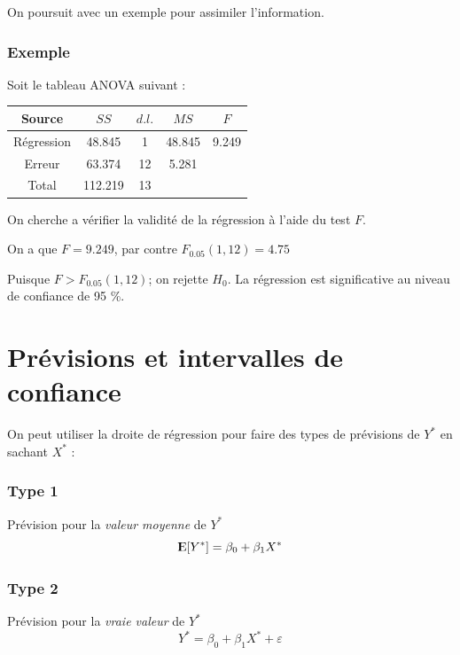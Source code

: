 \documentclass[11pt,french]{report}
\newcommand{\E}{{\rm I\kern-.3em E}}
\begin{document}
\bigskip
On poursuit avec un exemple pour assimiler l'information.

\subsubsection*{Exemple}
Soit le tableau ANOVA suivant :
\begin{center}
\begin{tabular}{|c|c|c|c|c|}
\hline
\rowcolor{backcolour}
Source & $SS$ & $d.l.$ & $MS$ & $F$ \\
\hline
Régression & 48.845 & 1 & 48.845 & 9.249 \\
Erreur & 63.374 & 12 & 5.281 & \\
\hline
Total & 112.219 & 13 & & \\
\hline
\end{tabular}
\end{center}
On cherche a vérifier la validité de la régression à l'aide du test $F$. \newline

On a que $F = 9.249$, par contre $F_{0.05}(1, 12) = 4.75$ \newline

Puisque $F>F_{0.05}(1, 12)$; on rejette $H_0$. La régression est significative au niveau de confiance de 95 \%. \newline


\section{Prévisions et intervalles de confiance}
On peut utiliser la droite de régression pour faire des types de prévisions de $Y^*$ en sachant $X^*$ :
\subsubsection*{Type 1}
Prévision pour la \emph{valeur moyenne} de $Y^*$
$$
\E[Y^*] = \beta_0 + \beta_1X^*
$$

\subsubsection*{Type 2}
Prévision pour la \emph{vraie valeur} de $Y^*$
$$
Y^* = \beta_0 + \beta_1X^* + \varepsilon
$$
\end{document}
